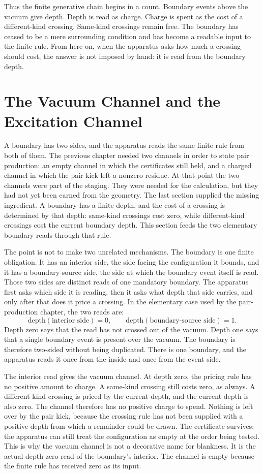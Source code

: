Thus the finite generative chain begins in a count. Boundary events above the vacuum
give depth. Depth is read as charge. Charge is spent as the cost of a different-kind
crossing. Same-kind crossings remain free. The boundary has ceased to be a mere
surrounding condition and has become a readable input to the finite rule. From here on,
when the apparatus asks how much a crossing should cost, the answer is not imposed by
hand: it is read from the boundary depth.

\section{The Vacuum Channel and the Excitation Channel}

A boundary has two sides, and the apparatus reads the same finite rule from both of
them. The previous chapter needed two channels in order to state pair production: an
empty channel in which the certificates still held, and a charged channel in which the
pair kick left a nonzero residue. At that point the two channels were part of the
staging. They were needed for the calculation, but they had not yet been earned from
the geometry. The last section supplied the missing ingredient. A boundary has a
finite depth, and the cost of a crossing is determined by that depth: same-kind
crossings cost zero, while different-kind crossings cost the current boundary depth.
This section feeds the two elementary boundary reads through that rule.

The point is not to make two unrelated mechanisms. The boundary is one finite
obligation. It has an interior side, the side facing the configuration it bounds, and
it has a boundary-source side, the side at which the boundary event itself is read.
Those two sides are distinct reads of one mandatory boundary. The apparatus first asks
which side it is reading, then it asks what depth that side carries, and only after
that does it price a crossing. In the elementary case used by the pair-production
chapter, the two reads are:
\[
  \mathrm{depth}(\text{interior side}) = 0,
  \qquad
  \mathrm{depth}(\text{boundary-source side}) = 1.
\]
Depth zero says that the read has not crossed out of the vacuum. Depth one says that a
single boundary event is present over the vacuum. The boundary is therefore two-sided
without being duplicated. There is one boundary, and the apparatus reads it once from
the inside and once from the event side.

The interior read gives the vacuum channel. At depth zero, the pricing rule has no
positive amount to charge. A same-kind crossing still costs zero, as always. A
different-kind crossing is priced by the current depth, and the current depth is also
zero. The channel therefore has no positive charge to spend. Nothing is left over by
the pair kick, because the crossing rule has not been supplied with a positive depth
from which a remainder could be drawn. The certificate survives: the apparatus can
still treat the configuration as empty at the order being tested. This is why the
vacuum channel is not a decorative name for blankness. It is the actual depth-zero
read of the boundary's interior. The channel is empty because the finite rule has
received zero as its input.

